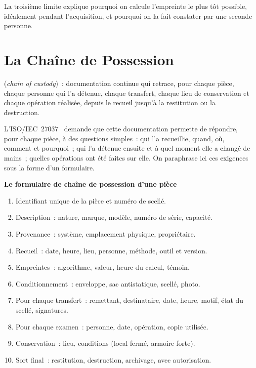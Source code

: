 La troisième limite explique pourquoi on calcule l'empreinte le plus tôt
possible, idéalement pendant l'acquisition, et pourquoi on la fait
constater par une seconde personne.

\section{La Chaîne de Possession}
\label{sec:c02-chaine}

\begin{boxdef}
\textbf{} (\textit{chain of custody})~:
documentation continue qui retrace, pour chaque pièce, chaque personne qui
l'a détenue, chaque transfert, chaque lieu de conservation et chaque
opération réalisée, depuis le recueil jusqu'à la restitution ou la
destruction.
\end{boxdef}

L'ISO/IEC~27037~\cite{iso27037_2012} demande que cette documentation permette
de répondre, pour chaque pièce, à des questions simples~: qui l'a recueillie,
quand, où, comment et pourquoi~; qui l'a détenue ensuite et à quel moment
elle a changé de mains~; quelles opérations ont été faites sur elle. On
paraphrase ici ces exigences sous la forme d'un formulaire.

\begin{boxprocedure}
\textbf{Le formulaire de chaîne de possession d'une pièce}
\begin{enumerate}
    \item Identifiant unique de la pièce et numéro de scellé.
    \item Description~: nature, marque, modèle, numéro de série, capacité.
    \item Provenance~: système, emplacement physique, propriétaire.
    \item Recueil~: date, heure, lieu, personne, méthode, outil et version.
    \item Empreintes~: algorithme, valeur, heure du calcul, témoin.
    \item Conditionnement~: enveloppe, sac antistatique, scellé, photo.
    \item Pour chaque transfert~: remettant, destinataire, date, heure,
          motif, état du scellé, signatures.
    \item Pour chaque examen~: personne, date, opération, copie utilisée.
    \item Conservation~: lieu, conditions (local fermé, armoire forte).
    \item Sort final~: restitution, destruction, archivage, avec
          autorisation.
\end{enumerate}
\end{boxprocedure}

